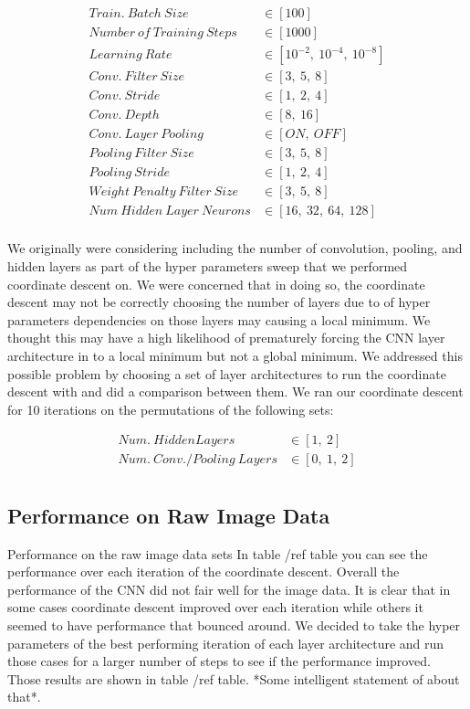 \documentclass[journal]{IEEEtran}
\begin{document}
\begin{align*}
Train.\ Batch\ Size  &\in [100]\\
Number\ of\ Training\ Steps  &\in [1000]\\
Learning\ Rate &\in [10^{-2},\ 10^{-4},\ 10^{-8}]\\
Conv.\ Filter\ Size &\in [3,\ 5,\ 8]\\
Conv.\ Stride &\in [1,\ 2,\ 4]\\
Conv.\ Depth &\in [8,\ 16]\\
Conv.\ Layer\ Pooling\  &\in [ON,\ OFF]\\
Pooling\ Filter\ Size &\in [3,\ 5,\ 8]\\
Pooling\ Stride &\in [1,\ 2,\ 4]\\
Weight\ Penalty\ Filter\ Size &\in [3,\ 5,\ 8]\\
Num\ Hidden\ Layer\ Neurons &\in [16,\ 32,\ 64,\ 128]\\
\end{align*}

We originally were considering including the number of convolution, pooling, and hidden layers as part of the hyper parameters sweep that we performed coordinate descent on. We were concerned that in doing so, the coordinate descent may not be correctly choosing the number of layers due to  of hyper parameters dependencies on those layers may causing a local minimum. We thought this may have a high likelihood of prematurely forcing the CNN layer architecture in to a local minimum but not a global minimum. We addressed this possible problem by choosing a set of layer architectures to run the coordinate descent with and did a comparison between them. We ran our coordinate descent for 10 iterations on the permutations of the following sets:

\begin{align*}
Num.\ Hidden Layers\  &\in [1,\ 2]\\
Num.\ Conv./Pooling\ Layers &\in [0,\ 1,\ 2]\\
\end{align*}


\subsection{Performance on Raw Image Data}



Performance on the raw image data sets In table /ref table you can see the performance over each iteration of the coordinate descent. Overall the performance of the CNN did not fair well for the image data. It is clear that in some cases coordinate descent improved over each iteration while others it seemed to have performance that bounced around. We decided to take the hyper parameters of the best performing iteration of each layer architecture and run those cases for a larger number of steps to see if the performance improved. Those results are shown in table /ref table. *Some intelligent statement of about that*. 
\end{document}
